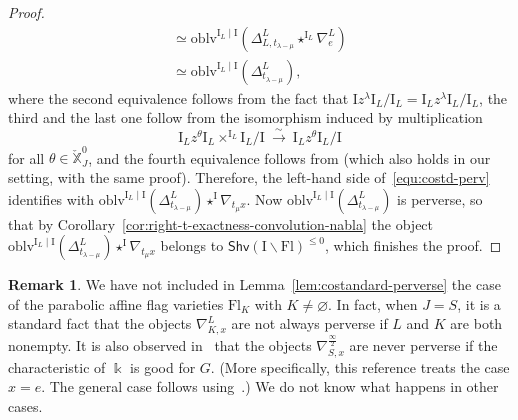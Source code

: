 \documentclass[11pt]{amsart}
\numberwithin{equation}{section}
\theoremstyle{plain}
\theoremstyle{definition}
\newtheorem{rmk}[thm]{Remark}
\newcommand{\I}{{\mathrm I}}
\renewcommand{\k}{\Bbbk}
\newcommand{\X}{{\mathbb X}}
\newcommand{\Xd}{\check{\X}}
\newcommand{\xs}{{\ \xrightarrow{\sim}\ }}
\newcommand{\semi}{{{\frac{\infty}{2}}}}
\newcommand{\oblv}{\mathrm{oblv}}
\newcommand{\Shv}{\mathsf{Shv}}
\newcommand{\Fl}{\mathrm{Fl}}
\begin{document}
\begin{proof}
\begin{multline*}
\simeq \oblv^{\I_L\mid \I}(\Delta^L_{L,t_{\lambda-\mu}} \star^{\I_L} \nabla^L_e) \\
\simeq \oblv^{\I_L\mid \I}(\Delta^L_{t_{\lambda-\mu}}),
\end{multline*}
where the second equivalence follows from the fact that $\I z^\lambda \I_L/\I_L= \I_L z^\lambda \I_L/\I_L$, the third and the last one follow from the isomorphism induced by multiplication 
\[
\I_L z^\theta \I_L \times^{\I_L} \I_L/\I \xs \I_L z^\theta \I_L/\I
\]
for all $\theta\in \Xd_J^0$,
and the fourth equivalence follows from \cite[Lemma 3.1.5]{DL23} (which also holds in our setting, with the same proof).
Therefore, the left-hand side of~\eqref{equ:costd-perv} identifies with $\oblv^{\I_L\mid \I}(\Delta^L_{t_{\lambda-\mu}}) \star^\I \nabla_{t_\mu x}$.
Now $\oblv^{\I_L\mid \I}(\Delta^L_{t_{\lambda-\mu}})$ is perverse, so that by Corollary~\ref{cor:right-t-exactness-convolution-nabla} the object $\oblv^{\I_L\mid \I}(\Delta^L_{t_{\lambda-\mu}}) \star^\I \nabla_{t_\mu x}$ belongs to $\Shv(\I\backslash \Fl)^{\leq 0}$, which finishes the proof.
\end{proof}

\begin{rmk}
We have not included in Lemma~\ref{lem:costandard-perverse} the case of the parabolic affine flag varieties $\Fl_K$ with $K \neq \varnothing$. In fact, when $J=S$, it is a standard fact that the objects $\nabla^{L}_{K,x}$ are not always perverse if $L$ and $K$ are both nonempty. 
It is also observed in~\cite[\S 6.6]{adr} that the objects $\nabla_{S,x}^{\semi}$ are never perverse if the characteristic of $\k$ is good for $G$. (More specifically, this reference treats the case $x=e$. The general case follows using~\cite[Eqn.~(5.6)]{adr}.) We do not know what happens in other cases.
\end{rmk}
\end{document}
